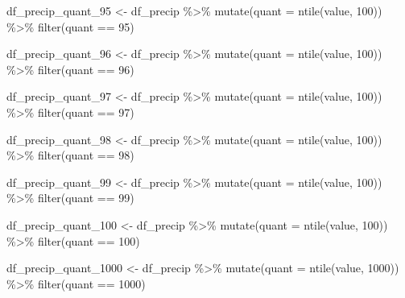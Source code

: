 \documentclass[
  paper=a4,
  ,captions=tableheading
]{scrartcl}
\newenvironment{Shaded}{\begin{snugshade}}{\end{snugshade}}
\newcommand{\AttributeTok}[1]{\textcolor[rgb]{0.77,0.63,0.00}{#1}}
\newcommand{\DecValTok}[1]{\textcolor[rgb]{0.00,0.00,0.81}{#1}}
\newcommand{\FunctionTok}[1]{\textcolor[rgb]{0.00,0.00,0.00}{#1}}
\newcommand{\NormalTok}[1]{#1}
\newcommand{\OtherTok}[1]{\textcolor[rgb]{0.56,0.35,0.01}{#1}}
\newcommand{\SpecialCharTok}[1]{\textcolor[rgb]{0.00,0.00,0.00}{#1}}
\begin{document}
\begin{Shaded}
\begin{Highlighting}[]
\NormalTok{df\_precip\_quant\_95 }\OtherTok{\textless{}{-}}\NormalTok{ df\_precip }\SpecialCharTok{\%\textgreater{}\%} 
  \FunctionTok{mutate}\NormalTok{(}\AttributeTok{quant =} \FunctionTok{ntile}\NormalTok{(value, }\DecValTok{100}\NormalTok{)) }\SpecialCharTok{\%\textgreater{}\%}
  \FunctionTok{filter}\NormalTok{(quant }\SpecialCharTok{==} \DecValTok{95}\NormalTok{)}

\NormalTok{df\_precip\_quant\_96 }\OtherTok{\textless{}{-}}\NormalTok{ df\_precip }\SpecialCharTok{\%\textgreater{}\%} 
  \FunctionTok{mutate}\NormalTok{(}\AttributeTok{quant =} \FunctionTok{ntile}\NormalTok{(value, }\DecValTok{100}\NormalTok{)) }\SpecialCharTok{\%\textgreater{}\%}
  \FunctionTok{filter}\NormalTok{(quant }\SpecialCharTok{==} \DecValTok{96}\NormalTok{)}

\NormalTok{df\_precip\_quant\_97 }\OtherTok{\textless{}{-}}\NormalTok{ df\_precip }\SpecialCharTok{\%\textgreater{}\%} 
  \FunctionTok{mutate}\NormalTok{(}\AttributeTok{quant =} \FunctionTok{ntile}\NormalTok{(value, }\DecValTok{100}\NormalTok{)) }\SpecialCharTok{\%\textgreater{}\%}
  \FunctionTok{filter}\NormalTok{(quant }\SpecialCharTok{==} \DecValTok{97}\NormalTok{)}

\NormalTok{df\_precip\_quant\_98 }\OtherTok{\textless{}{-}}\NormalTok{ df\_precip }\SpecialCharTok{\%\textgreater{}\%} 
  \FunctionTok{mutate}\NormalTok{(}\AttributeTok{quant =} \FunctionTok{ntile}\NormalTok{(value, }\DecValTok{100}\NormalTok{)) }\SpecialCharTok{\%\textgreater{}\%}
  \FunctionTok{filter}\NormalTok{(quant }\SpecialCharTok{==} \DecValTok{98}\NormalTok{)}

\NormalTok{df\_precip\_quant\_99 }\OtherTok{\textless{}{-}}\NormalTok{ df\_precip }\SpecialCharTok{\%\textgreater{}\%} 
  \FunctionTok{mutate}\NormalTok{(}\AttributeTok{quant =} \FunctionTok{ntile}\NormalTok{(value, }\DecValTok{100}\NormalTok{)) }\SpecialCharTok{\%\textgreater{}\%}
  \FunctionTok{filter}\NormalTok{(quant }\SpecialCharTok{==} \DecValTok{99}\NormalTok{)}

\NormalTok{df\_precip\_quant\_100 }\OtherTok{\textless{}{-}}\NormalTok{ df\_precip }\SpecialCharTok{\%\textgreater{}\%} 
  \FunctionTok{mutate}\NormalTok{(}\AttributeTok{quant =} \FunctionTok{ntile}\NormalTok{(value, }\DecValTok{100}\NormalTok{)) }\SpecialCharTok{\%\textgreater{}\%}
  \FunctionTok{filter}\NormalTok{(quant }\SpecialCharTok{==} \DecValTok{100}\NormalTok{)}

\NormalTok{df\_precip\_quant\_1000 }\OtherTok{\textless{}{-}}\NormalTok{ df\_precip }\SpecialCharTok{\%\textgreater{}\%} 
  \FunctionTok{mutate}\NormalTok{(}\AttributeTok{quant =} \FunctionTok{ntile}\NormalTok{(value, }\DecValTok{1000}\NormalTok{)) }\SpecialCharTok{\%\textgreater{}\%}
  \FunctionTok{filter}\NormalTok{(quant }\SpecialCharTok{==} \DecValTok{1000}\NormalTok{)}


\end{Highlighting}
\end{Shaded}
\end{document}
